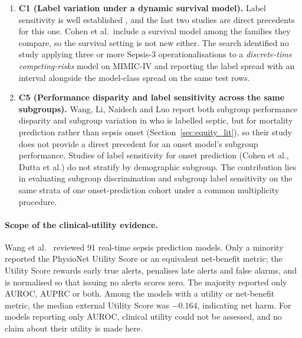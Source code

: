 \begin{enumerate}
    \item \textbf{C1 (Label variation under a dynamic survival model).} Label
    sensitivity is well established \cite{johnson2018comparative,
    cohen2024subtle, dutta2026performance}, and the last two studies are
    direct precedents for this one. Cohen et al.\ include a survival model
    among the families they compare, so the survival setting is not new
    either. The search identified no study applying three or more Sepsis-3
    operationalisations to a \emph{discrete-time competing-risks} model on
    MIMIC-IV and reporting the label spread with an interval alongside the
    model-class spread on the same test rows.

    \item \textbf{C5 (Performance disparity and label sensitivity across the
    same subgroups).} Wang, Li, Naidech and Luo \cite{wang2022equity} report
    both subgroup performance disparity and subgroup variation in who is
    labelled septic, but for mortality prediction rather than sepsis onset
    (Section~\ref{sec:equity_lit}), so their study does not provide a direct
    precedent for an onset model's subgroup performance. Studies of label
    sensitivity for onset prediction (Cohen et al., Dutta et al.) do not
    stratify by demographic subgroup. The contribution lies in evaluating
    subgroup discrimination and subgroup label sensitivity on the same strata
    of one onset-prediction cohort under a common multiplicity procedure.
\end{enumerate}

\paragraph{Scope of the clinical-utility evidence.}
Wang et al.\ \cite{wang2025srpm} reviewed 91 real-time sepsis prediction
models. Only a minority reported the PhysioNet Utility Score
\cite{reyna2020utility} or an equivalent net-benefit metric; the Utility Score
rewards early true alerts, penalises late alerts and false alarms, and is
normalised so that issuing no alerts scores zero. The majority reported only
AUROC, AUPRC or both. Among the models with a utility or net-benefit metric,
the median external Utility Score was $-0.164$, indicating net harm. For
models reporting only AUROC, clinical utility could not be assessed, and no
claim about their utility is made here.


